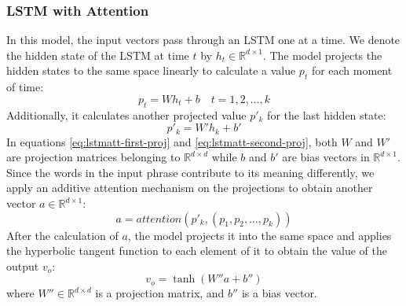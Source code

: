 \documentclass{article}
\begin{document}
\subsubsection{LSTM with Attention}
In this model, the input vectors pass through an LSTM \citep{hochreiter1997long} one at a time. We denote the hidden state of the LSTM at time $t$ by $h_t\in\mathbb{R}^{d\times 1}$. The model projects the hidden states to the same space linearly to calculate a value $p_t$ for each moment of time:
\begin{equation}
p_t = W h_t + b \quad t=1,2,\dots,k
\label{eq:lstmatt-first-proj}
\end{equation}
Additionally, it calculates another projected value $p'_k$ for the last hidden state:
\begin{equation}
p'_k = W' h_k + b'
\label{eq:lstmatt-second-proj}
\end{equation}
In equations \ref{eq:lstmatt-first-proj} and \ref{eq:lstmatt-second-proj}, both $W$ and $W'$ are projection matrices belonging to $\mathbb{R}^{d \times d}$ while $b$ and $b'$ are bias vectors in $\mathbb{R}^{d\times 1}$.
Since the words in the input phrase contribute to its meaning differently, we apply an additive attention mechanism on the projections to obtain another vector $a\in\mathbb{R}^{d\times1}$:
\begin{equation}
a=attention(p'_k, (p_1,p_2,\dots,p_k))
\label{eq:attention-on-projections}
\end{equation}
After the calculation of $a$, the model projects it into the same space and applies the hyperbolic tangent function to each element of it to obtain the value of the output $v_o$:
\begin{equation}
v_o = \tanh(W'' a + b'')
\label{eq:lstm-output}
\end{equation}
where  $W''\in\mathbb{R}^{d\times d}$ is a projection matrix, and $b''$ is a bias vector.
\end{document}
